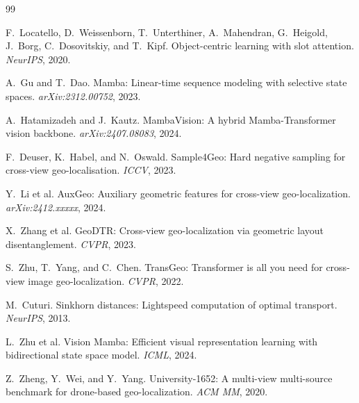 \documentclass{article}
\begin{document}
{\small


\begin{thebibliography}{99}

F.~Locatello, D.~Weissenborn, T.~Unterthiner, A.~Mahendran, G.~Heigold, J.~Borg, C.~Dosovitskiy, and T.~Kipf.
\newblock Object-centric learning with slot attention.
\newblock \emph{NeurIPS}, 2020.

A.~Gu and T.~Dao.
\newblock Mamba: Linear-time sequence modeling with selective state spaces.
\newblock \emph{arXiv:2312.00752}, 2023.

A.~Hatamizadeh and J.~Kautz.
\newblock MambaVision: A hybrid Mamba-Transformer vision backbone.
\newblock \emph{arXiv:2407.08083}, 2024.

F.~Deuser, K.~Habel, and N.~Oswald.
\newblock Sample4Geo: Hard negative sampling for cross-view geo-localisation.
\newblock \emph{ICCV}, 2023.

Y.~Li et al.
\newblock AuxGeo: Auxiliary geometric features for cross-view geo-localization.
\newblock \emph{arXiv:2412.xxxxx}, 2024.

X.~Zhang et al.
\newblock GeoDTR: Cross-view geo-localization via geometric layout disentanglement.
\newblock \emph{CVPR}, 2023.

S.~Zhu, T.~Yang, and C.~Chen.
\newblock TransGeo: Transformer is all you need for cross-view image geo-localization.
\newblock \emph{CVPR}, 2022.

M.~Cuturi.
\newblock Sinkhorn distances: Lightspeed computation of optimal transport.
\newblock \emph{NeurIPS}, 2013.

L.~Zhu et al.
\newblock Vision Mamba: Efficient visual representation learning with bidirectional state space model.
\newblock \emph{ICML}, 2024.

Z.~Zheng, Y.~Wei, and Y.~Yang.
\newblock University-1652: A multi-view multi-source benchmark for drone-based geo-localization.
\newblock \emph{ACM MM}, 2020.


\end{thebibliography}}
\end{document}
